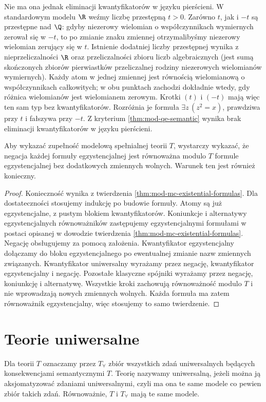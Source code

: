 \begin{przyklad}
Nie ma ona jednak eliminacji kwantyfikatorów w języku
pierścieni. W standardowym modelu $\R$ weźmy liczbę
przestępną $t>0$. Zarówno $t$, jak i $-t$ są przestępne
nad $\Q$: gdyby niezerowy wielomian o współczynnikach
wymiernych zerował się w $-t$, to po zmianie znaku
zmiennej otrzymalibyśmy niezerowy wielomian zerujący
się w $t$. Istnienie dodatniej liczby przestępnej
wynika z nieprzeliczalności $\R$ oraz przeliczalności
zbioru liczb algebraicznych (jest sumą skończonych
zbiorów pierwiastków przeliczalnej rodziny niezerowych
wielomianów wymiernych).
Każdy atom w jednej zmiennej jest równością wielomianową
o współczynnikach całkowitych; w obu punktach
zachodzi dokładnie wtedy, gdy różnica wielomianów
jest wielomianem zerowym. Krotki $(t)$ i $(-t)$
mają więc ten sam typ bez kwantyfikatorów.
Rozróżnia je formuła $\exists z\,(z^2=x)$, prawdziwa
przy $t$ i fałszywa przy $-t$.
Z kryterium \ref{thm:mod-qe-semantic} wynika brak
eliminacji kwantyfikatorów w języku pierścieni.
\end{przyklad}

\begin{wniosek}
\label{cor:mod-mc-neg-existential}
Aby wykazać zupełność modelową spełnialnej teorii $T$,
wystarczy wykazać, że negacja każdej formuły
egzystencjalnej jest równoważna modulo $T$ formule
egzystencjalnej bez dodatkowych zmiennych wolnych.
Warunek ten jest również konieczny.
\end{wniosek}
\begin{proof}
Konieczność wynika z twierdzenia
\ref{thm:mod-mc-existential-formulas}.
Dla dostateczności stosujemy indukcję po budowie
formuły. Atomy są już egzystencjalne, z pustym
blokiem kwantyfikatorów. Koniunkcje i alternatywy
egzystencjalnych równoważników zastępujemy
egzystencjalnymi formułami w postaci opisanej
w dowodzie twierdzenia
\ref{thm:mod-mc-existential-formulas}.
Negację obsługujemy za pomocą założenia.
Kwantyfikator egzystencjalny dołączamy do bloku
egzystencjalnego po ewentualnej zmianie nazw
zmiennych związanych. Kwantyfikator uniwersalny
wyrażamy przez negację, kwantyfikator egzystencjalny
i negację. Pozostałe klasyczne spójniki wyrażamy
przez negację, koniunkcję i alternatywę.
Wszystkie kroki zachowują równoważność modulo $T$
i nie wprowadzają nowych zmiennych wolnych.
Każda formuła ma zatem równoważnik egzystencjalny,
więc stosujemy to samo twierdzenie.
\end{proof}

\section{Teorie uniwersalne}
\begin{definicja}
\label{def:mod-mc-universal-theory}
Dla teorii $T$ oznaczamy przez $T_{\forall}$ zbiór
wszystkich zdań uniwersalnych będących konsekwencjami
semantycznymi $T$. Teorię nazywamy uniwersalną,
jeżeli można ją aksjomatyzować zdaniami uniwersalnymi,
czyli ma ona te same modele co pewien zbiór takich zdań.
Równoważnie, $T$ i $T_{\forall}$ mają te same modele.
\end{definicja}

